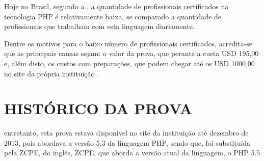 Hoje no Brasil, segundo a , a 
quantidade de profissionais certificados na tecnologia PHP é relativamente 
baixa, se comparado a quantidade de profissionais que trabalham com esta 
linguagem diariamente.

Dentre os motivos para o baixo número de profissionais certificados, acredita-se
que as principais causas sejam: o valor da prova, que perante a 
 custa USD 195,00 e, além disto,  os
custos com preparações, que podem chegar até os USD 1000,00 no site da  própria
instituição \cite{websiteZendOnlineTraining}.

\section{HISTÓRICO DA PROVA}

entretanto, esta prova estava disponível no site da
instituição até dezembro de 2013, pois abordava a versão 5.3 da
linguagem \acs{PHP}, sendo que, foi substituída pela \acs{ZCPE}, do inglês, \acl{ZCPE},
que aborda a versão atual da linguagem, o PHP 5.5 
